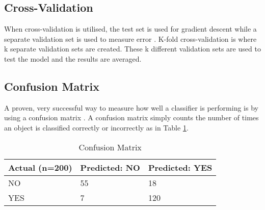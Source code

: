 \tocless\subsection{Cross-Validation}
When cross-validation is utilised, the test set is used for gradient descent while a separate validation set is used to measure error \parencite{MLANN}.
K-fold cross-validation is where k separate validation sets are created.
These k different validation sets are used to test the model and the results are averaged.


\tocless\subsection{Confusion Matrix}
A proven, very successful way to measure how well a classifier is performing is by using a confusion matrix \parencite{handsOnML}.
A confusion matrix simply counts the number of times an object is classified correctly or incorrectly as in Table \ref{cm}.

\begin{table}[]
\centering
\caption{Confusion Matrix}
\label{cm}
\begin{tabular}{|l|l|l|}
\hline
\textbf{Actual (n=200)} & \textbf{Predicted: NO} & \textbf{Predicted: YES} \\ \hline
NO                      & 55                     & 18                      \\ \hline
YES                     & 7                      & 120                     \\ \hline
\end{tabular}
\end{table}


